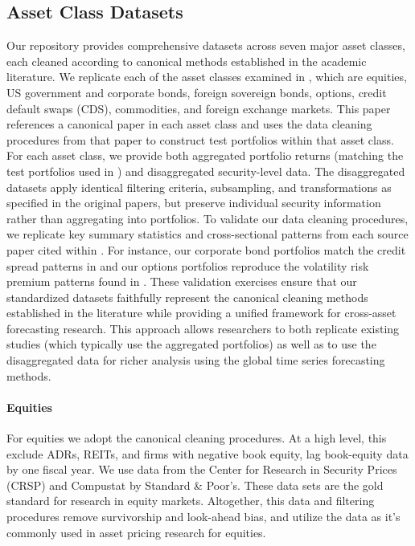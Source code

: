 \documentclass{article}
\begin{document}
\subsection{Asset Class Datasets}
Our repository provides comprehensive datasets across seven major asset classes, each cleaned according to canonical methods established in the academic literature. We replicate each of the asset classes examined in \cite{He2017}, which are equities, US government and corporate bonds, foreign sovereign bonds, options, credit default swaps (CDS), commodities, and foreign exchange markets. 
This paper references a canonical paper in each asset class and uses the data cleaning procedures from that paper to construct test portfolios within that asset class.
For each asset class, we provide both aggregated portfolio returns (matching the test portfolios used in \cite{He2017}) and disaggregated security-level data. The disaggregated datasets apply identical filtering criteria, subsampling, and transformations as specified in the original papers, but preserve individual security information rather than aggregating into portfolios. 
To validate our data cleaning procedures, we replicate key summary statistics and cross-sectional patterns from each source paper cited within \cite{He2017}. For instance, our corporate bond portfolios match the credit spread patterns in \cite{Nozawa2017} and our options portfolios reproduce the volatility risk premium patterns found in \cite{Constantinides2013}. These validation exercises ensure that our standardized datasets faithfully represent the canonical cleaning methods established in the literature while providing a unified framework for cross-asset forecasting research. This approach allows researchers to both replicate existing studies (which typically use the aggregated portfolios) as well as to use the disaggregated data for richer analysis using the global time
series forecasting methods.



\paragraph{Equities}
For equities we adopt the canonical \cite{Fama1993} cleaning procedures. At a high level, this exclude ADRs, REITs, and firms with negative book equity, lag book-equity data by one fiscal year. We use data from the Center for Research in Security Prices (CRSP) and Compustat by Standard \& Poor's. These data sets
are the gold standard for research in equity markets. Altogether, this data and filtering procedures remove survivorship and look-ahead bias, and utilize the data as it's commonly used in asset pricing research for equities.
\end{document}
